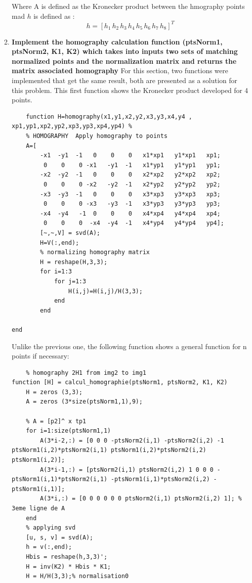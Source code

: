 \documentclass[12pt, twoside]{report}
\begin{document}
\begin{enumerate}
    Where A is defined as the Kronecker product between the hmography points mad $h$ is defined as :\\
    \begin{equation}
        h=[h_1 \, h_2 \, h_3 \, h_4 \, h_5 \, h_6 \, h_7 \, h_8]^T
    \end{equation}
    
    \item \textbf{Implement the homography calculation function (ptsNorm1, ptsNorm2, K1, K2) which takes into
inputs two sets of matching normalized points and the normalization matrix and returns the matrix
associated homography}
For this section, two functions were implemented that get the same result, both are presented as a solution for this problem.
This first function shows the Kronecker product developed for 4 points.
\begin{lstlisting}
    function H=homography(x1,y1,x2,y2,x3,y3,x4,y4 , xp1,yp1,xp2,yp2,xp3,yp3,xp4,yp4) %
    % HOMOGRAPHY  Apply homography to points    
    A=[
        -x1  -y1  -1   0    0    0   x1*xp1   y1*xp1   xp1;
         0    0    0 -x1   -y1  -1   x1*yp1   y1*yp1   yp1;
        -x2  -y2  -1   0    0    0   x2*xp2   y2*xp2   xp2;
         0    0    0 -x2   -y2  -1   x2*yp2   y2*yp2   yp2;
        -x3  -y3  -1   0    0    0   x3*xp3   y3*xp3   xp3;
         0    0    0 -x3   -y3  -1   x3*yp3   y3*yp3   yp3;
        -x4  -y4   -1  0    0    0   x4*xp4   y4*xp4   xp4;
         0    0    0  -x4  -y4  -1   x4*yp4   y4*yp4   yp4];       
        [~,~,V] = svd(A);
        H=V(:,end);
        % normalizing homography matrix
        H = reshape(H,3,3);
        for i=1:3
            for j=1:3
                H(i,j)=H(i,j)/H(3,3);
            end
        end
    
end
\end{lstlisting}
Unlike the previous one, the following function shows a general function for n points if necessary:
\begin{lstlisting}
    % homography 2H1 from img2 to img1
function [H] = calcul_homographie(ptsNorm1, ptsNorm2, K1, K2)
    H = zeros (3,3);
    A = zeros (3*size(ptsNorm1,1),9);
    
    % A = [p2]^ x tp1
    for i=1:size(ptsNorm1,1)
        A(3*i-2,:) = [0 0 0 -ptsNorm2(i,1) -ptsNorm2(i,2) -1 ptsNorm1(i,2)*ptsNorm2(i,1) ptsNorm1(i,2)*ptsNorm2(i,2) ptsNorm1(i,2)];
        A(3*i-1,:) = [ptsNorm2(i,1) ptsNorm2(i,2) 1 0 0 0 -ptsNorm1(i,1)*ptsNorm2(i,1) -ptsNorm1(i,1)*ptsNorm2(i,2) -ptsNorm1(i,1)];
        A(3*i,:) = [0 0 0 0 0 0 ptsNorm2(i,1) ptsNorm2(i,2) 1]; % 3eme ligne de A
    end
    % applying svd
    [u, s, v] = svd(A);
    h = v(:,end);
	Hbis = reshape(h,3,3)';
    H = inv(K2) * Hbis * K1;
    H = H/H(3,3);% normalisation0
  

\end{lstlisting}
\end{enumerate}
\end{document}
